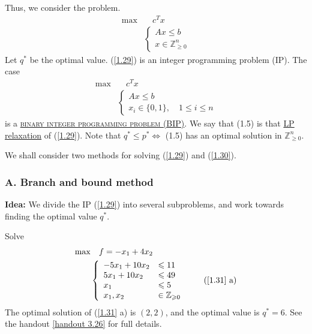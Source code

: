 Thus, we consider the problem.
\begin{align}
    \max & \quad c^T x\label{1.29}\\
    &\left\lbrace \begin{array}{l}
         Ax\leqslant b \\
         x\in\mathbb{Z}^n_{\geqslant 0} 
    \end{array}\right.\nonumber
\end{align}
Let $q^*$ be the optimal value. (\ref{1.29}) is an integer programming problem (IP). The case
\begin{align}
    \max & \quad c^T x\label{1.30} \\
    & \left\lbrace\begin{array}{l}
         Ax\leqslant b \\
         x_i \in\{0,1\}, \quad 1\leqslant i\leqslant n  
    \end{array} \right.\nonumber
\end{align}
is a \underline{\textcolor{MarkerColour}{\textsc{binary integer programming problem (BIP)}}}. We say that (1.5) is that \underline{LP relaxation} of (\ref{1.29}). Note that $q^*\leqslant p^* \Longleftrightarrow$ (1.5) has an optimal solution in $\mathbb{Z}_{\geqslant 0}^n$.

We shall consider two methods for solving (\ref{1.29}) and (\ref{1.30}).

\subsubsection{A. Branch and bound method}
\noindent \textbf{Idea:} We divide the IP (\ref{1.29}) into several subproblems, and work towards finding the optimal value $q^*$.
\begin{example}
    Solve 
    \begin{align}
        \max & \quad f = -x_1 + 4x_2\label{1.31}\\
        & \left\lbrace\begin{array}{ll}
             -5x_1 + 10x_2&\leqslant 11  \\
             5x_1 + 10x_2 &\leqslant 49 \\
             x_1 &\leqslant 5 \\
             x_1, x_2 &\in\mathbb{Z}_{\geqslant 0}
        \end{array} \right. \tag{\ref{1.31} a} \nonumber
    \end{align}
    The optimal solution of (\ref{1.31} a) is $(2, 2)$, and the optimal value is $q^* = 6$. See the handout \ref{handout 3.26} for full details.
\end{example}

